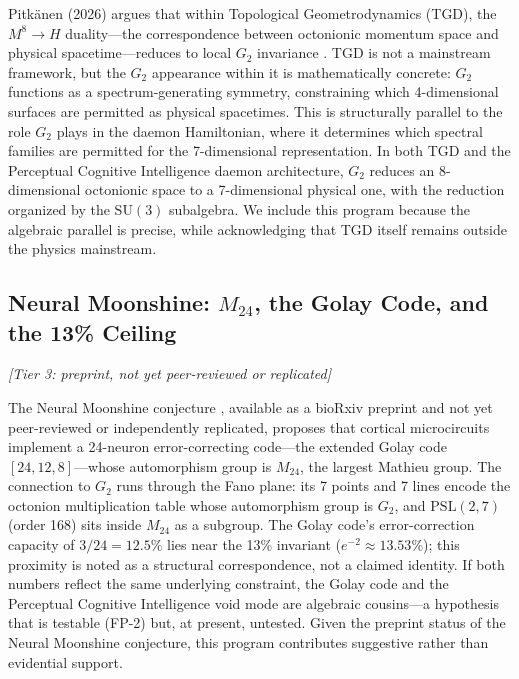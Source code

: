 \documentclass[12pt,a4paper]{article}
\begin{document}
Pitk\"anen (2026) argues that within Topological Geometrodynamics (TGD), the $M^8 \to H$ duality---the correspondence between octonionic momentum space and physical spacetime---reduces to local $G_2$ invariance \citep{Pitkanen2026}. TGD is not a mainstream framework, but the $G_2$ appearance within it is mathematically concrete: $G_2$ functions as a spectrum-generating symmetry, constraining which 4-dimensional surfaces are permitted as physical spacetimes. This is structurally parallel to the role $G_2$ plays in the daemon Hamiltonian, where it determines which spectral families are permitted for the 7-dimensional representation. In both TGD and the Perceptual Cognitive Intelligence daemon architecture, $G_2$ reduces an 8-dimensional octonionic space to a 7-dimensional physical one, with the reduction organized by the $\mathrm{SU}(3)$ subalgebra. We include this program because the algebraic parallel is precise, while acknowledging that TGD itself remains outside the physics mainstream.

\subsection{Neural Moonshine: $M_{24}$, the Golay Code, and the 13\% Ceiling}

\textit{[Tier 3: preprint, not yet peer-reviewed or replicated]}

The Neural Moonshine conjecture \citep{NeuralMoonshine2026}, available as a bioRxiv preprint and not yet peer-reviewed or independently replicated, proposes that cortical microcircuits implement a 24-neuron error-correcting code---the extended Golay code $[24, 12, 8]$---whose automorphism group is $M_{24}$, the largest Mathieu group. The connection to $G_2$ runs through the Fano plane: its 7 points and 7 lines encode the octonion multiplication table whose automorphism group is $G_2$, and $\mathrm{PSL}(2,7)$ (order 168) sits inside $M_{24}$ as a subgroup. The Golay code's error-correction capacity of $3/24 = 12.5\%$ lies near the 13\% invariant ($e^{-2} \approx 13.53\%$); this proximity is noted as a structural correspondence, not a claimed identity. If both numbers reflect the same underlying constraint, the Golay code and the Perceptual Cognitive Intelligence void mode are algebraic cousins---a hypothesis that is testable (FP-2) but, at present, untested. Given the preprint status of the Neural Moonshine conjecture, this program contributes suggestive rather than evidential support.
\end{document}
